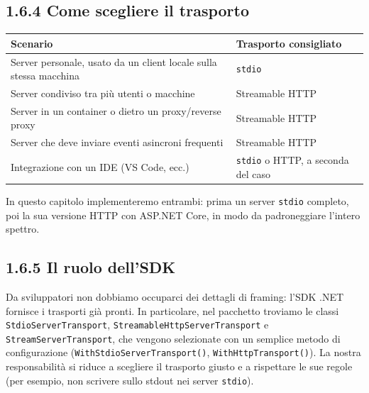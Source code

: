 \documentclass[
  italian,
  10pt,
]{book}
\newcounter{none} %
\begin{document}
\subsection{1.6.4 Come scegliere il
trasporto}\label{come-scegliere-il-trasporto}

{\def\LTcaptype{none} %
\begin{longtable}[]{@{}
  >{\raggedright\arraybackslash}p{}
  >{\raggedright\arraybackslash}p{}@{}}
\toprule\noalign{}
\begin{minipage}[b]{\linewidth}\raggedright
Scenario
\end{minipage} & \begin{minipage}[b]{\linewidth}\raggedright
Trasporto consigliato
\end{minipage} \\
\midrule\noalign{}
\endhead
\bottomrule\noalign{}
\endlastfoot
Server personale, usato da un client locale sulla stessa macchina &
\texttt{stdio} \\
Server condiviso tra più utenti o macchine & Streamable HTTP \\
Server in un container o dietro un proxy/reverse proxy & Streamable
HTTP \\
Server che deve inviare eventi asincroni frequenti & Streamable HTTP \\
Integrazione con un IDE (VS Code, ecc.) & \texttt{stdio} o HTTP, a
seconda del caso \\
\end{longtable}
}

In questo capitolo implementeremo entrambi: prima un server
\texttt{stdio} completo, poi la sua versione HTTP con ASP.NET Core, in
modo da padroneggiare l'intero spettro.

\subsection{1.6.5 Il ruolo dell'SDK}\label{il-ruolo-dellsdk}

Da sviluppatori non dobbiamo occuparci dei dettagli di framing: l'SDK
.NET fornisce i trasporti già pronti. In particolare, nel pacchetto
troviamo le classi \texttt{StdioServerTransport},
\texttt{StreamableHttpServerTransport} e \texttt{StreamServerTransport},
che vengono selezionate con un semplice metodo di configurazione
(\texttt{WithStdioServerTransport()}, \texttt{WithHttpTransport()}). La
nostra responsabilità si riduce a scegliere il trasporto giusto e a
rispettare le sue regole (per esempio, non scrivere sullo stdout nei
server \texttt{stdio}).
\end{document}
